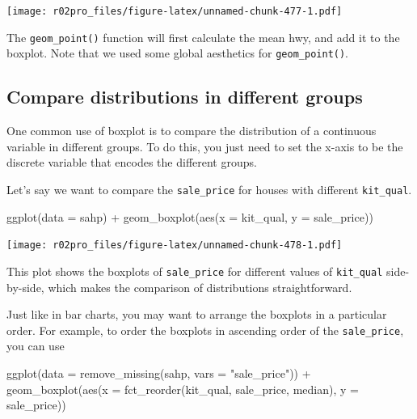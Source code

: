 \documentclass[
]{book}
\newenvironment{Shaded}{\begin{snugshade}}{\end{snugshade}}
\newcommand{\AttributeTok}[1]{\textcolor[rgb]{0.77,0.63,0.00}{#1}}
\newcommand{\FunctionTok}[1]{\textcolor[rgb]{0.00,0.00,0.00}{#1}}
\newcommand{\NormalTok}[1]{#1}
\newcommand{\SpecialCharTok}[1]{\textcolor[rgb]{0.00,0.00,0.00}{#1}}
\newcommand{\StringTok}[1]{\textcolor[rgb]{0.31,0.60,0.02}{#1}}
\begin{document}
\texttt{[image: r02pro\_files/figure-latex/unnamed-chunk-477-1.pdf]}

The \texttt{geom\_point()} function will first calculate the mean hwy, and add it to the boxplot. Note that we used some global aesthetics for \texttt{geom\_point()}.

\hypertarget{boxplot-2}{%
\subsection{Compare distributions in different groups}\label{boxplot-2}}

One common use of boxplot is to compare the distribution of a continuous variable in different groups. To do this, you just need to set the x-axis to be the discrete variable that encodes the different groups.

Let's say we want to compare the \texttt{sale\_price} for houses with different \texttt{kit\_qual}.

\begin{Shaded}
\begin{Highlighting}[]
\FunctionTok{ggplot}\NormalTok{(}\AttributeTok{data =}\NormalTok{ sahp) }\SpecialCharTok{+} \FunctionTok{geom\_boxplot}\NormalTok{(}\FunctionTok{aes}\NormalTok{(}\AttributeTok{x =}\NormalTok{ kit\_qual, }\AttributeTok{y =}\NormalTok{ sale\_price))}
\end{Highlighting}
\end{Shaded}

\texttt{[image: r02pro\_files/figure-latex/unnamed-chunk-478-1.pdf]}

This plot shows the boxplots of \texttt{sale\_price} for different values of \texttt{kit\_qual} side-by-side, which makes the comparison of distributions straightforward.

Just like in bar charts, you may want to arrange the boxplots in a particular order. For example, to order the boxplots in ascending order of the \texttt{sale\_price}, you can use

\begin{Shaded}
\begin{Highlighting}[]
\FunctionTok{ggplot}\NormalTok{(}\AttributeTok{data =} \FunctionTok{remove\_missing}\NormalTok{(sahp, }\AttributeTok{vars =} \StringTok{"sale\_price"}\NormalTok{)) }\SpecialCharTok{+} \FunctionTok{geom\_boxplot}\NormalTok{(}\FunctionTok{aes}\NormalTok{(}\AttributeTok{x =} \FunctionTok{fct\_reorder}\NormalTok{(kit\_qual, sale\_price, median), }\AttributeTok{y =}\NormalTok{ sale\_price)) }
\end{Highlighting}
\end{Shaded}
\end{document}
